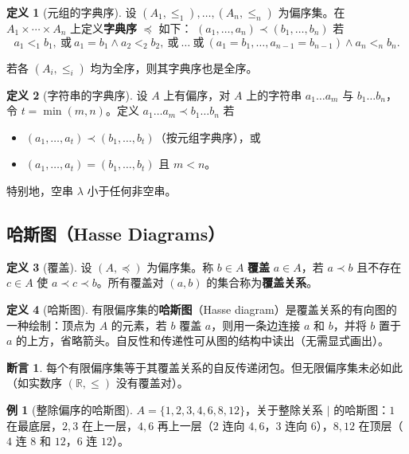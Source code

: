 \documentclass[UTF8,11pt,a4paper]{ctexbook}   %
\theoremstyle{definition}
\newtheorem{definition}{定义}[section]
\newtheorem{example}{例}[section]
\newtheorem{proposition}{断言}[section]
\begin{document}
\begin{definition}[元组的字典序]
设 $(A_1,\leq_1),\dots,(A_n,\leq_n)$ 为偏序集。在 $A_1 \times \cdots \times A_n$ 上定义\textbf{字典序} $\preceq$ 如下：
$(a_1,\dots,a_n) \prec (b_1,\dots,b_n)$ 若
\[
a_1 <_1 b_1,\ \text{或}\ a_1=b_1 \land a_2 <_2 b_2,\ \text{或}\ \dots\ \text{或}\ (a_1=b_1,\dots,a_{n-1}=b_{n-1}) \land a_n <_n b_n.
\]
\end{definition}

若各 $(A_i,\leq_i)$ 均为全序，则其字典序也是全序。

\begin{definition}[字符串的字典序]
设 $A$ 上有偏序，对 $A$ 上的字符串 $a_1\dots a_m$ 与 $b_1\dots b_n$，令 $t=\min(m,n)$。定义
$a_1\dots a_m \prec b_1\dots b_n$ 若
\begin{itemize}
    \item $(a_1,\dots,a_t) \prec (b_1,\dots,b_t)$（按元组字典序），或
    \item $(a_1,\dots,a_t) = (b_1,\dots,b_t)$ 且 $m < n$。
\end{itemize}
特别地，空串 $\lambda$ 小于任何非空串。
\end{definition}

\subsection{哈斯图（Hasse Diagrams）}

\begin{definition}[覆盖]
设 $(A,\preceq)$ 为偏序集。称 $b \in A$ \textbf{覆盖} $a \in A$，若 $a \prec b$ 且不存在 $c \in A$ 使 $a \prec c \prec b$。所有覆盖对 $(a,b)$ 的集合称为\textbf{覆盖关系}。
\end{definition}

\begin{definition}[哈斯图]
有限偏序集的\textbf{哈斯图}（Hasse diagram）是覆盖关系的有向图的一种绘制：顶点为 $A$ 的元素，若 $b$ 覆盖 $a$，则用一条边连接 $a$ 和 $b$，并将 $b$ 置于 $a$ 的上方，省略箭头。自反性和传递性可从图的结构中读出（无需显式画出）。
\end{definition}

\begin{proposition}
每个有限偏序集等于其覆盖关系的自反传递闭包。但无限偏序集未必如此（如实数序 $(\mathbb{R},\leq)$ 没有覆盖对）。
\end{proposition}

\begin{example}[整除偏序的哈斯图]
$A=\{1,2,3,4,6,8,12\}$，关于整除关系 $|$ 的哈斯图：$1$ 在最底层，$2,3$ 在上一层，$4,6$ 再上一层（$2$ 连向 $4,6$，$3$ 连向 $6$），$8,12$ 在顶层（$4$ 连 $8$ 和 $12$，$6$ 连 $12$）。
\end{example}
\end{document}
